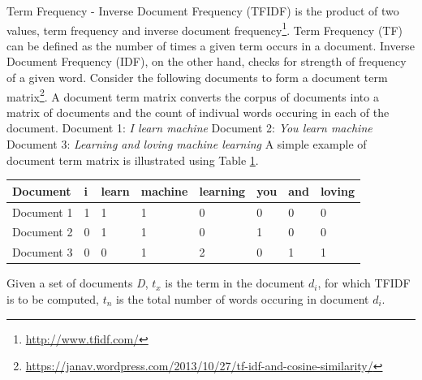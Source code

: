 \documentclass[a4paper,12pt,twoside]{report}
\begin{document}
Term Frequency - Inverse Document Frequency (\acs{TFIDF}) is the product of two values, term frequency and inverse document frequency\footnote{\url{http://www.tfidf.com/}}. Term Frequency (TF) can be defined as the number of times a given term occurs in a document. Inverse Document Frequency (IDF), on the other hand, checks for strength of frequency of a given word. 
\newline \newline
Consider the following documents to form a document term matrix\footnote{\url{https://janav.wordpress.com/2013/10/27/tf-idf-and-cosine-similarity/}}. A document term matrix converts the corpus of documents into a matrix of documents and the count of indivual words occuring in each of the document. 
\newline 
Document 1: \textit{I learn machine} 
\newline \newline
Document 2: \textit{You learn machine} 
\newline \newline
Document 3: \textit{Learning and loving machine learning}
\newline \newline
A simple example of document term matrix is illustrated using Table \ref{tab:dtmExample}. 
\begin{table} %
    \centering
    \begin{adjustbox}{max width=\columnwidth}
    \def\arraystretch{1} %
    \begin{tabular}{p{3cm} p{2cm} p{2cm} p{2cm} p{2cm} p{2cm} p{2cm} p{2cm}}
        \toprule
        \textbf{Document} & \textbf{i} & \textbf{learn} & \textbf{machine} & \textbf{learning} & \textbf{you} & \textbf{and} & \textbf{loving}\\
        \midrule
			Document 1 & 1 & 1 & 1 & 0 & 0 & 0 & 0\\
			Document 2 & 0 & 1 & 1 & 0 & 1 & 0 & 0 \\ 
			Document 3 & 0 & 0 & 1 & 2 & 0 & 1 & 1 \\
        \midrule
    \end{tabular}
    \end{adjustbox}
    \label{tab:dtmExample}
\end{table}
Given a set of documents \textit{D}, \textit{$t_x$} is the term in the document \textit{$d_i$}, for which \acs{TFIDF} is to be computed, \textit{$t_n$} is the total number of words occuring in document \textit{$d_i$}.
\end{document}

